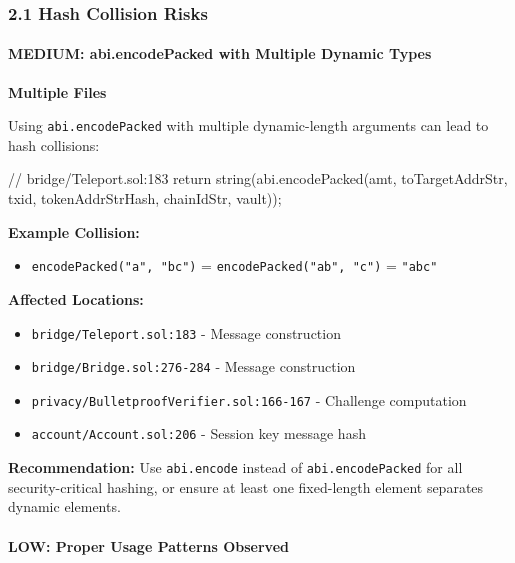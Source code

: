 \documentclass[
]{article}
\newenvironment{Shaded}{}{}
\newcommand{\NormalTok}[1]{#1}
\providecommand{\tightlist}{%
  \setlength{\itemsep}{0pt}\setlength{\parskip}{0pt}}
\begin{document}
\subsubsection{2.1 Hash Collision Risks}\label{21-hash-collision-risks}

\paragraph{MEDIUM: abi.encodePacked with Multiple Dynamic
Types}\label{medium-abiencodepacked-with-multiple-dynamic-types}

\textbf{Multiple Files}

Using \texttt{abi.encodePacked} with multiple dynamic-length arguments
can lead to hash collisions:

\begin{Shaded}
\begin{Highlighting}[]
\NormalTok{// bridge/Teleport.sol:183}
\NormalTok{return string(abi.encodePacked(amt, toTargetAddrStr, txid, tokenAddrStrHash, chainIdStr, vault));}
\end{Highlighting}
\end{Shaded}

\textbf{Example Collision:}

\begin{itemize}
\tightlist
\item
  \texttt{encodePacked("a",\ "bc")} = \texttt{encodePacked("ab",\ "c")}
  = \texttt{"abc"}
\end{itemize}

\textbf{Affected Locations:}

\begin{itemize}
\tightlist
\item
  \texttt{bridge/Teleport.sol:183} - Message construction
\item
  \texttt{bridge/Bridge.sol:276-284} - Message construction
\item
  \texttt{privacy/BulletproofVerifier.sol:166-167} - Challenge
  computation
\item
  \texttt{account/Account.sol:206} - Session key message hash
\end{itemize}

\textbf{Recommendation:} Use \texttt{abi.encode} instead of
\texttt{abi.encodePacked} for all security-critical hashing, or ensure
at least one fixed-length element separates dynamic elements.

\paragraph{LOW: Proper Usage Patterns
Observed}\label{low-proper-usage-patterns-observed}
\end{document}
